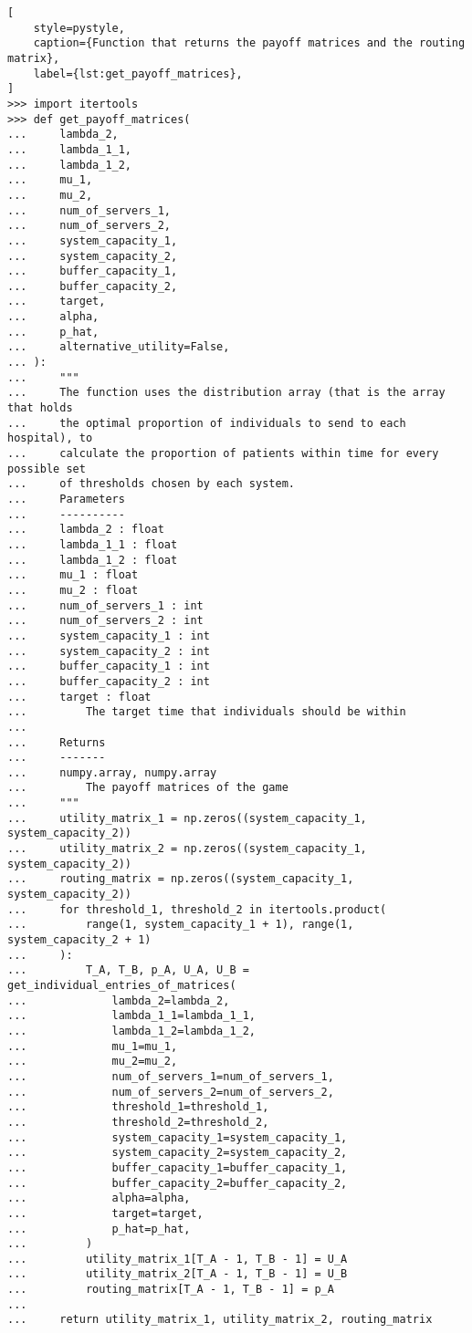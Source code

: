 \begin{lstlisting}[
    style=pystyle,
    caption={Function that returns the payoff matrices and the routing matrix},
    label={lst:get_payoff_matrices},
]
>>> import itertools
>>> def get_payoff_matrices(
...     lambda_2,
...     lambda_1_1,
...     lambda_1_2,
...     mu_1,
...     mu_2,
...     num_of_servers_1,
...     num_of_servers_2,
...     system_capacity_1,
...     system_capacity_2,
...     buffer_capacity_1,
...     buffer_capacity_2,
...     target,
...     alpha,
...     p_hat,
...     alternative_utility=False,
... ):
...     """
...     The function uses the distribution array (that is the array that holds
...     the optimal proportion of individuals to send to each hospital), to
...     calculate the proportion of patients within time for every possible set
...     of thresholds chosen by each system.
...     Parameters
...     ----------
...     lambda_2 : float
...     lambda_1_1 : float
...     lambda_1_2 : float
...     mu_1 : float
...     mu_2 : float
...     num_of_servers_1 : int
...     num_of_servers_2 : int
...     system_capacity_1 : int
...     system_capacity_2 : int
...     buffer_capacity_1 : int
...     buffer_capacity_2 : int
...     target : float
...         The target time that individuals should be within
...
...     Returns
...     -------
...     numpy.array, numpy.array
...         The payoff matrices of the game
...     """
...     utility_matrix_1 = np.zeros((system_capacity_1, system_capacity_2))
...     utility_matrix_2 = np.zeros((system_capacity_1, system_capacity_2))
...     routing_matrix = np.zeros((system_capacity_1, system_capacity_2))
...     for threshold_1, threshold_2 in itertools.product(
...         range(1, system_capacity_1 + 1), range(1, system_capacity_2 + 1)
...     ):
...         T_A, T_B, p_A, U_A, U_B = get_individual_entries_of_matrices(
...             lambda_2=lambda_2,
...             lambda_1_1=lambda_1_1,
...             lambda_1_2=lambda_1_2,
...             mu_1=mu_1,
...             mu_2=mu_2,
...             num_of_servers_1=num_of_servers_1,
...             num_of_servers_2=num_of_servers_2,
...             threshold_1=threshold_1,
...             threshold_2=threshold_2,
...             system_capacity_1=system_capacity_1,
...             system_capacity_2=system_capacity_2,
...             buffer_capacity_1=buffer_capacity_1,
...             buffer_capacity_2=buffer_capacity_2,
...             alpha=alpha,
...             target=target,
...             p_hat=p_hat,
...         )
...         utility_matrix_1[T_A - 1, T_B - 1] = U_A
...         utility_matrix_2[T_A - 1, T_B - 1] = U_B
...         routing_matrix[T_A - 1, T_B - 1] = p_A
...
...     return utility_matrix_1, utility_matrix_2, routing_matrix
        
\end{lstlisting}
    
